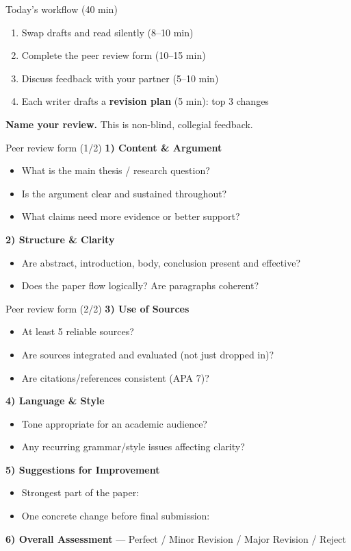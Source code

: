\documentclass[aspectratio=169]{beamer}
\begin{document}
\begin{frame}{Today's workflow (40 min)}
\begin{enumerate}
  \item Swap drafts and read silently (8–10 min)
  \item Complete the peer review form (10–15 min)
  \item Discuss feedback with your partner (5–10 min)
  \item Each writer drafts a \textbf{revision plan} (5 min): top 3 changes
\end{enumerate}
\textbf{Name your review.} This is non-blind, collegial feedback.
\end{frame}

\begin{frame}{Peer review form (1/2)}
\small
\textbf{1) Content \& Argument}
\begin{itemize}
  \item What is the main thesis / research question?
  \item Is the argument clear and sustained throughout?
  \item What claims need more evidence or better support?
\end{itemize}
\medskip
\textbf{2) Structure \& Clarity}
\begin{itemize}
  \item Are abstract, introduction, body, conclusion present and effective?
  \item Does the paper flow logically? Are paragraphs coherent?
\end{itemize}
\end{frame}

\begin{frame}{Peer review form (2/2)}
\small
\textbf{3) Use of Sources}
\begin{itemize}
  \item At least 5 reliable sources?
  \item Are sources integrated and evaluated (not just dropped in)?
  \item Are citations/references consistent (APA 7)?
\end{itemize}
\medskip
\textbf{4) Language \& Style}
\begin{itemize}
  \item Tone appropriate for an academic audience?
  \item Any recurring grammar/style issues affecting clarity?
\end{itemize}
\medskip
\textbf{5) Suggestions for Improvement}
\begin{itemize}
  \item Strongest part of the paper:
  \item One concrete change before final submission:
\end{itemize}
\medskip
\textbf{6) Overall Assessment} — Perfect / Minor Revision / Major Revision / Reject
\end{frame}
\end{document}
